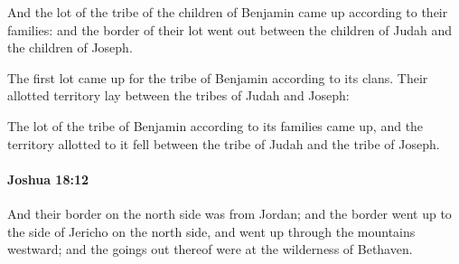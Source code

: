 			\begin{versebox}
					\item[BHS] 
					\item[ASV] And the lot of the tribe of the children of Benjamin came up according to their families: and the border of their lot went out between the children of Judah and the children of Joseph.
					\item[NIV] The first lot came up for the tribe of Benjamin according to its clans. Their allotted territory lay between the tribes of Judah and Joseph:
					\item[NRSV] The lot of the tribe of Benjamin according to its families came up, and the territory allotted to it fell between the tribe of Judah and the tribe of Joseph.
			\end{versebox}

		\paragraph{Joshua 18:12} %
			\label{JOSHUA-18-12}

			And their border on the north side was from Jordan; and the border went up to the side of Jericho on the north side, and went up through the mountains westward; and the goings out thereof were at the wilderness of Bethaven.

